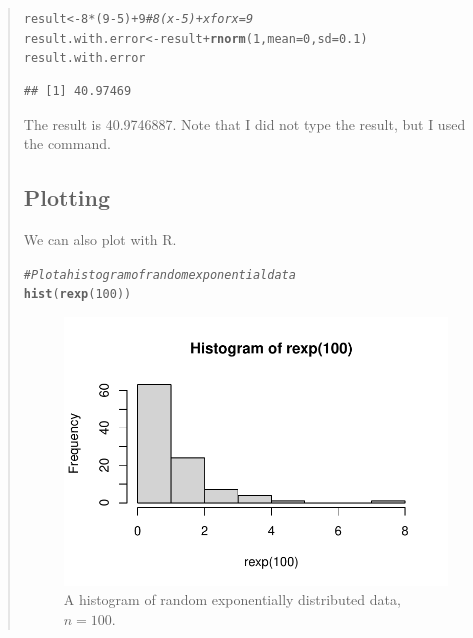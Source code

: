 \documentclass{article}\usepackage[]{graphicx}\usepackage[]{xcolor}
\makeatletter
\def\maxwidth{ %
  \ifdim\Gin@nat@width>\linewidth
    \linewidth
  \else
    \Gin@nat@width
  \fi
}
\newcommand{\hlnum}[1]{\textcolor[rgb]{0.686,0.059,0.569}{#1}}%
\newcommand{\hlcom}[1]{\textcolor[rgb]{0.678,0.584,0.686}{\textit{#1}}}%
\newcommand{\hlopt}[1]{\textcolor[rgb]{0,0,0}{#1}}%
\newcommand{\hldef}[1]{\textcolor[rgb]{0.345,0.345,0.345}{#1}}%
\newcommand{\hlkwb}[1]{\textcolor[rgb]{0.69,0.353,0.396}{#1}}%
\newcommand{\hlkwc}[1]{\textcolor[rgb]{0.333,0.667,0.333}{#1}}%
\newcommand{\hlkwd}[1]{\textcolor[rgb]{0.737,0.353,0.396}{\textbf{#1}}}%
\newenvironment{kframe}{%
 \def\at@end@of@kframe{}%
 \ifinner\ifhmode%
  \def\at@end@of@kframe{\end{minipage}}%
  \begin{minipage}{\columnwidth}%
 \fi\fi%
 \def\FrameCommand##1{\hskip\@totalleftmargin \hskip-\fboxsep
 \colorbox{shadecolor}{##1}\hskip-\fboxsep
     \hskip-\linewidth \hskip-\@totalleftmargin \hskip\columnwidth}%
 \MakeFramed {\advance\hsize-\width
   \@totalleftmargin\z@ \linewidth\hsize
   \@setminipage}}%
 {\par\unskip\endMakeFramed%
 \at@end@of@kframe}
\newenvironment{knitrout}{}{} %
\makeatother
\begin{document}
\begin{multicols}{2}
\begin{quote}
\begin{knitrout}
\begin{kframe}
\begin{alltt}
\hldef{result} \hlkwb{<-} \hlnum{8}\hlopt{*}\hldef{(}\hlnum{9}\hlopt{-}\hlnum{5}\hldef{)} \hlopt{+} \hlnum{9} \hlcom{# 8(x-5) + x for x = 9}
\hldef{result.with.error} \hlkwb{<-} \hldef{result} \hlopt{+} \hlkwd{rnorm}\hldef{(}\hlnum{1}\hldef{,} \hlkwc{mean} \hldef{=} \hlnum{0}\hldef{,} \hlkwc{sd} \hldef{=} \hlnum{0.1}\hldef{)}
\hldef{result.with.error}
\end{alltt}
\begin{verbatim}
## [1] 40.97469
\end{verbatim}
\end{kframe}
\end{knitrout}
The result is 40.9746887. Note that I did not type the result, but I used the command.
\subsection{Plotting}
\noindent We can also plot with R.
\begin{knitrout}\scriptsize
{}\color{fgcolor}\begin{kframe}
\begin{alltt}
\hlcom{#Plot a histogram of random exponential data}
\hlkwd{hist}\hldef{(}\hlkwd{rexp}\hldef{(}\hlnum{100}\hldef{))}
\end{alltt}
\end{kframe}
\end{knitrout}
\begin{figure}[H]
\begin{center}
\begin{knitrout}
\color{fgcolor}
\includegraphics[width=\maxwidth]{figure/unnamed-chunk-6-1} 
\end{knitrout}
\caption{A histogram of random exponentially distributed data, $n=100$.}
\label{plot1} %
\end{center}
\end{figure}
\columnbreak

\end{quote}
\end{multicols}
\end{document}
